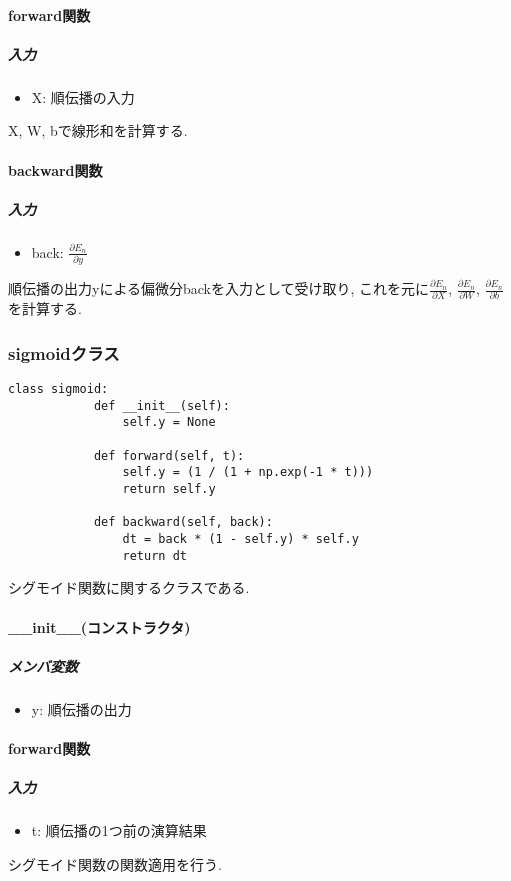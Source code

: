 \documentclass[a4j, titlepage]{jarticle}
\begin{document}
        \paragraph*{forward関数}
            \subparagraph*{入力}
            \begin{itemize}
                \item X: 順伝播の入力
            \end{itemize}
            X, W, bで線形和を計算する.
        \paragraph*{backward関数}
            \subparagraph*{入力}
            \begin{itemize}
                \item back: \(\displaystyle \frac{\partial E_n}{\partial y}\)
            \end{itemize}
            順伝播の出力yによる偏微分backを入力として受け取り, これを元に\(\displaystyle \frac{\partial E_n}{\partial X}\), \(\displaystyle \frac{\partial E_n}{\partial W}\), \(\displaystyle \frac{\partial E_n}{\partial b}\)を計算する.

    \subsubsection{sigmoidクラス}
        \begin{lstlisting}[caption=シグモイド関数の計算 ,label=fuga]
        class sigmoid:
            def __init__(self):
                self.y = None

            def forward(self, t):
                self.y = (1 / (1 + np.exp(-1 * t)))
                return self.y

            def backward(self, back):
                dt = back * (1 - self.y) * self.y
                return dt
        \end{lstlisting}
        シグモイド関数に関するクラスである.
        \paragraph*{\_\_init\_\_(コンストラクタ)}
            \subparagraph*{メンバ変数}
            \begin{itemize}
                \item y: 順伝播の出力
            \end{itemize}
        \paragraph*{forward関数}
            \subparagraph*{入力}
            \begin{itemize}
                \item t: 順伝播の1つ前の演算結果
            \end{itemize}
            シグモイド関数の関数適用を行う.
\end{document}
